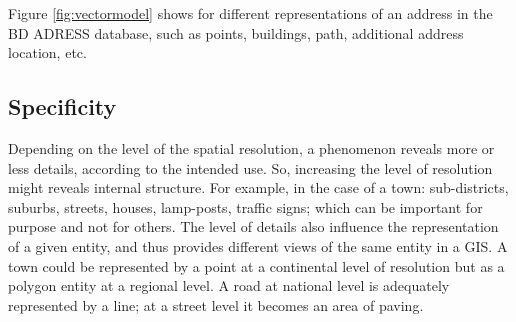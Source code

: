 Figure \ref{fig:vectormodel} shows for different representations of an address in the BD ADRESS\circledR \hspace{1pt} database, such as points, buildings, path, additional address location, etc.

\begin{figure}[ht!]
\end{figure}


\subsection{Specificity}
 Depending on the level of the spatial resolution, a phenomenon reveals more or less details, according to the intended use. So, increasing the level of resolution might reveals internal structure. For example, in the case of a town: sub-districts, suburbs, streets, houses, lamp-posts, traffic signs; which can be important for purpose and not for others. The level of details also influence the representation of a given entity, and thus provides different views of the same entity in a GIS. A town could be represented by a point at a continental level of resolution but as a polygon entity at a regional level. A road at national level is adequately represented by a line; at a street level it becomes an area of paving.
 
